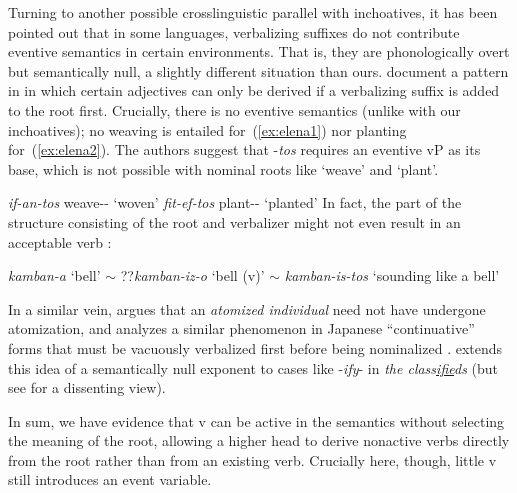\begin{exe}
\begin{xlist}
\begin{xlist}
\begin{exe}
\begin{xlist}
\begin{xlist}
\begin{exe}
\begin{xlist}
\begin{xlist}
\begin{exe}
\begin{exe}
\begin{xlist}
\begin{exe}
\begin{exe}
\begin{xlist}
\begin{exe}
\begin{exe}
\begin{exe}
\begin{exe}
\begin{exe}
\begin{xlist}
\begin{exe}
\begin{xlist}
\begin{exe}
\begin{exe}
\begin{xlist}
\begin{exe}
\begin{xlist}
\begin{exe}
\begin{xlist}
\begin{exe}
\begin{exe}
\begin{exe}
\begin{xlist}
\begin{exe}
\begin{exe}
\begin{exe}
\begin{xlist}
\begin{exe}
\begin{xlist}
\begin{exe}
\begin{xlist}
\begin{exe}
\begin{xlist}
Turning to another possible crosslinguistic parallel with inchoatives, it has been pointed out that in some languages, verbalizing suffixes do not contribute eventive semantics in certain environments. That is, they are phonologically overt but semantically null, a slightly different situation than ours. \citet{elenasamioti13,elenasamioti14} document a pattern in  in which certain adjectives can only be derived if a verbalizing suffix is added to the root first. Crucially, there is no eventive semantics (unlike with our inchoatives); no weaving is entailed for~(\ref{ex:elena1}) nor planting for~(\ref{ex:elena2}). {The authors suggest that -\emph{tos} requires an eventive vP as its base, which is not possible with nominal roots like `weave' and `plant'.}
 \begin{exe}
\ex  \label{ex:elena1} \emph{if-an-tos} weave-- `woven' 
\ex  \label{ex:elena2} \emph{fit-ef-tos} plant-- `planted' \hfill \citep[97]{elenasamioti14} 
 \z 
In fact, the part of the structure consisting of the root and verbalizer might not even result in an acceptable verb \citep[100]{elenasamioti14}:
 \begin{exe}
\ex  \emph{kamban-a} `bell' $\sim$ ??\emph{kamban-iz-o} `bell (v)' $\sim$ \emph{kamban-is-tos} `sounding like a bell' 
 \z 

In a similar vein, \cite{marantz13} argues that an \emph{atomized individual} need not have undergone atomization, and analyzes a similar phenomenon in Japanese ``continuative'' forms that must be vacuously verbalized first{ before being nominalized} \citep{volpe05}. \cite{anagnostopoulou14thli} extends this idea of a semantically null exponent to cases like -\emph{ify}- in \emph{the class\underline{ifie}ds} (but see \citealt{borer14lingua} for a dissenting view).

In sum, we have evidence that v can be active in the semantics without selecting the meaning of the root, allowing a higher {\vz} head to derive nonactive verbs directly from the root rather than from an existing verb. Crucially here, though, little v still introduces an event variable.

	

\end{exe}
\end{exe}
\end{xlist}
\end{exe}
\end{xlist}
\end{exe}
\end{xlist}
\end{exe}
\end{xlist}
\end{exe}
\end{exe}
\end{exe}
\end{xlist}
\end{exe}
\end{exe}
\end{exe}
\end{xlist}
\end{exe}
\end{xlist}
\end{exe}
\end{xlist}
\end{exe}
\end{exe}
\end{xlist}
\end{exe}
\end{xlist}
\end{exe}
\end{exe}
\end{exe}
\end{exe}
\end{exe}
\end{xlist}
\end{exe}
\end{exe}
\end{xlist}
\end{exe}
\end{exe}
\end{xlist}
\end{xlist}
\end{exe}
\end{xlist}
\end{xlist}
\end{exe}
\end{xlist}
\end{xlist}
\end{exe}
